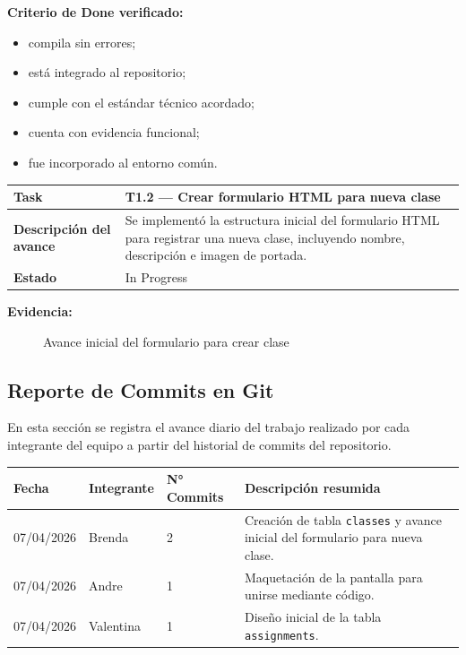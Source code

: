 \documentclass[12pt,a4paper]{article}
\renewcommand{\arraystretch}{1.45}
\begin{document}
\textbf{Criterio de Done verificado:}
\begin{itemize}
    \item compila sin errores;
    \item está integrado al repositorio;
    \item cumple con el estándar técnico acordado;
    \item cuenta con evidencia funcional;
    \item fue incorporado al entorno común.
\end{itemize}

\vspace{0.7cm}

\begin{table}[H]
\centering
\renewcommand{\arraystretch}{1.2}
\begin{tabular}{|p{3cm}|p{10cm}|}
\hline
\textbf{Task} & T1.2 --- Crear formulario HTML para nueva clase \\
\hline
\textbf{Descripción del avance} & Se implementó la estructura inicial del formulario HTML para registrar una nueva clase, incluyendo nombre, descripción e imagen de portada. \\
\hline
\textbf{Estado} & In Progress \\
\hline
\end{tabular}
\end{table}

\textbf{Evidencia:}
\begin{figure}[H]
    \centering
    \caption{Avance inicial del formulario para crear clase}
\end{figure}
\subsection{Reporte de Commits en Git}

En esta sección se registra el avance diario del trabajo realizado por cada
integrante del equipo a partir del historial de commits del repositorio.

\begin{longtable}{|p{2cm}|p{2.5cm}|p{2cm}|p{6cm}|}
\hline
\textbf{Fecha} & \textbf{Integrante} & \textbf{N° Commits} & \textbf{Descripción resumida} \\
\hline
07/04/2026 & Brenda & 2 & Creación de tabla \texttt{classes} y avance inicial del formulario para nueva clase. \\
\hline
07/04/2026 & Andre & 1 & Maquetación de la pantalla para unirse mediante código. \\
\hline
07/04/2026 & Valentina & 1 & Diseño inicial de la tabla \texttt{assignments}. \\
\hline
\end{longtable}
\end{document}
